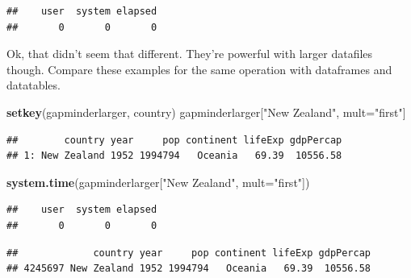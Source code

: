 \documentclass[]{article}
\newenvironment{Shaded}{\begin{snugshade}}{\end{snugshade}}
\newcommand{\KeywordTok}[1]{\textcolor[rgb]{0.13,0.29,0.53}{\textbf{{#1}}}}
\newcommand{\DataTypeTok}[1]{\textcolor[rgb]{0.13,0.29,0.53}{{#1}}}
\newcommand{\DecValTok}[1]{\textcolor[rgb]{0.00,0.00,0.81}{{#1}}}
\newcommand{\StringTok}[1]{\textcolor[rgb]{0.31,0.60,0.02}{{#1}}}
\newcommand{\NormalTok}[1]{{#1}}
\begin{document}
\begin{verbatim}
##    user  system elapsed 
##       0       0       0
\end{verbatim}

Ok, that didn't seem that different. They're powerful with larger
datafiles though. Compare these examples for the same operation with
dataframes and datatables.

\begin{Shaded}
\begin{Highlighting}[]
\KeywordTok{setkey}\NormalTok{(gapminderlarger, country)}
\NormalTok{gapminderlarger[}\StringTok{"New Zealand"}\NormalTok{, mult=}\StringTok{"first"}\NormalTok{] }
\end{Highlighting}
\end{Shaded}

\begin{verbatim}
##        country year     pop continent lifeExp gdpPercap
## 1: New Zealand 1952 1994794   Oceania   69.39  10556.58
\end{verbatim}

\begin{Shaded}
\begin{Highlighting}[]
\KeywordTok{system.time}\NormalTok{(gapminderlarger[}\StringTok{"New Zealand"}\NormalTok{, }\DataTypeTok{mult=}\StringTok{"first"}\NormalTok{])}
\end{Highlighting}
\end{Shaded}

\begin{verbatim}
##    user  system elapsed 
##       0       0       0
\end{verbatim}

\begin{Shaded}
\end{Shaded}

\begin{verbatim}
##             country year     pop continent lifeExp gdpPercap
## 4245697 New Zealand 1952 1994794   Oceania   69.39  10556.58
\end{verbatim}

\begin{Shaded}
\end{Shaded}
\end{document}
